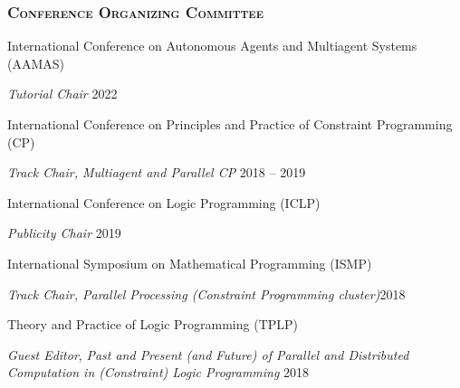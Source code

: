 \subsubsection*{\scshape Conference Organizing Committee}{}{}{}
  \beginList

    \item International Conference on Autonomous Agents and Multiagent Systems (AAMAS)
    \beginSubList
      \item \emph{Tutorial Chair}   \hfill{2022}
    \endSubList
    
  \item {International Conference on Principles and Practice of Constraint Programming (CP)}
  \beginSubList
    \item \emph{Track Chair, Multiagent and Parallel CP} \hfill{2018 -- 2019}
  \endSubList

  \item {International Conference on Logic Programming (ICLP)}
  \beginSubList
    \item \emph{Publicity Chair} \hfill{2019}
  \endSubList

  \item {International Symposium on Mathematical Programming (ISMP)}
  \beginSubList
    \item \emph{Track Chair, Parallel Processing (Constraint Programming cluster)}\hfill{2018}
  \endSubList

  \item {Theory and Practice of Logic Programming (TPLP)}
  \beginSubList
  \item \emph{Guest Editor}, \emph{Past and Present (and Future) of Parallel and Distributed Computation in (Constraint) Logic Programming} \hfill {2018}
  \endSubList
  \endList




